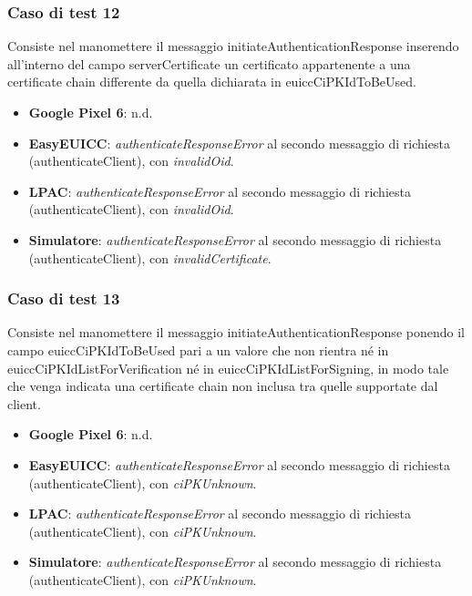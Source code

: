 \documentclass[10pt, oneside]{book}
\begin{document}
\subsubsection{Caso di test 12}
Consiste nel manomettere il messaggio initiateAuthenticationResponse inserendo all’interno del campo serverCertificate un certificato appartenente a una certificate chain differente da quella dichiarata in euiccCiPKIdToBeUsed.
\begin{itemize}
\item \textbf{Google Pixel 6}: n.d.
\item \textbf{EasyEUICC}: \textit{authenticateResponseError} al secondo messaggio di richiesta (authenticateClient), con \textit{invalidOid}.
\item \textbf{LPAC}: \textit{authenticateResponseError} al secondo messaggio di richiesta (authenticateClient), con \textit{invalidOid}.
\item \textbf{Simulatore}: \textit{authenticateResponseError} al secondo messaggio di richiesta (authenticateClient), con \textit{invalidCertificate}.
\end{itemize}

\subsubsection{Caso di test 13}
Consiste nel manomettere il messaggio initiateAuthenticationResponse ponendo il campo euiccCiPKIdToBeUsed pari a un valore che non rientra né in euiccCiPKIdListForVerification né in euiccCiPKIdListForSigning, in modo tale che venga indicata una certificate chain non inclusa tra quelle supportate dal client.
\begin{itemize}
\item \textbf{Google Pixel 6}: n.d.
\item \textbf{EasyEUICC}: \textit{authenticateResponseError} al secondo messaggio di richiesta (authenticateClient), con \textit{ciPKUnknown}.
\item \textbf{LPAC}: \textit{authenticateResponseError} al secondo messaggio di richiesta (authenticateClient), con \textit{ciPKUnknown}.
\item \textbf{Simulatore}: \textit{authenticateResponseError} al secondo messaggio di richiesta (authenticateClient), con \textit{ciPKUnknown}.
\end{itemize}
\end{document}
